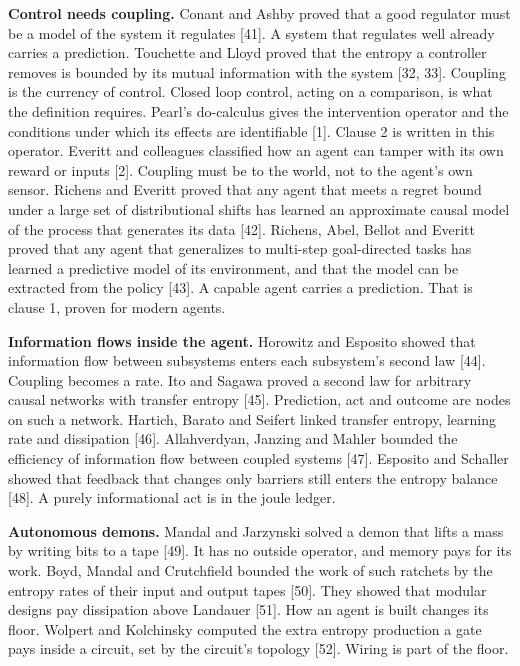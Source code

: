 \documentclass[
  10pt,
]{article}
\begin{document}
\textbf{Control needs coupling.} Conant and Ashby proved that a good
regulator must be a model of the system it regulates {[}41{]}. A system
that regulates well already carries a prediction. Touchette and Lloyd
proved that the entropy a controller removes is bounded by its mutual
information with the system {[}32, 33{]}. Coupling is the currency of
control. Closed loop control, acting on a comparison, is what the
definition requires. Pearl's do-calculus gives the intervention operator
and the conditions under which its effects are identifiable {[}1{]}.
Clause 2 is written in this operator. Everitt and colleagues classified
how an agent can tamper with its own reward or inputs {[}2{]}. Coupling
must be to the world, not to the agent's own sensor. Richens and Everitt
proved that any agent that meets a regret bound under a large set of
distributional shifts has learned an approximate causal model of the
process that generates its data {[}42{]}. Richens, Abel, Bellot and
Everitt proved that any agent that generalizes to multi-step
goal-directed tasks has learned a predictive model of its environment,
and that the model can be extracted from the policy {[}43{]}. A capable
agent carries a prediction. That is clause 1, proven for modern agents.

\textbf{Information flows inside the agent.} Horowitz and Esposito
showed that information flow between subsystems enters each subsystem's
second law {[}44{]}. Coupling becomes a rate. Ito and Sagawa proved a
second law for arbitrary causal networks with transfer entropy {[}45{]}.
Prediction, act and outcome are nodes on such a network. Hartich, Barato
and Seifert linked transfer entropy, learning rate and dissipation
{[}46{]}. Allahverdyan, Janzing and Mahler bounded the efficiency of
information flow between coupled systems {[}47{]}. Esposito and Schaller
showed that feedback that changes only barriers still enters the entropy
balance {[}48{]}. A purely informational act is in the joule ledger.

\textbf{Autonomous demons.} Mandal and Jarzynski solved a demon that
lifts a mass by writing bits to a tape {[}49{]}. It has no outside
operator, and memory pays for its work. Boyd, Mandal and Crutchfield
bounded the work of such ratchets by the entropy rates of their input
and output tapes {[}50{]}. They showed that modular designs pay
dissipation above Landauer {[}51{]}. How an agent is built changes its
floor. Wolpert and Kolchinsky computed the extra entropy production a
gate pays inside a circuit, set by the circuit's topology {[}52{]}.
Wiring is part of the floor.
\end{document}
